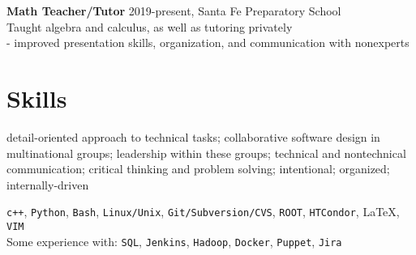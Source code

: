 \documentclass[letterpaper,12pt]{article} %
\begin{document}
 {\large {\bf Math Teacher/Tutor} 2019-present, Santa Fe Preparatory School} \\
 Taught algebra and calculus, as well as tutoring privately \\
- improved presentation skills, organization, and communication with nonexperts 

\section{Skills}

detail-oriented approach to technical tasks; collaborative software design in multinational groups; leadership within these groups; technical and nontechnical communication; critical thinking and problem solving; intentional; organized; internally-driven   %



\texttt{c++}, \texttt{Python}, \texttt{Bash}, \texttt{Linux/Unix}, \texttt{Git/Subversion/CVS}, \texttt{ROOT}, \texttt{HTCondor}, \LaTeX, \texttt{VIM} \\
Some experience with: \texttt{SQL}, \texttt{Jenkins}, \texttt{Hadoop}, \texttt{Docker}, \texttt{Puppet}, \texttt{Jira}
\end{document}
